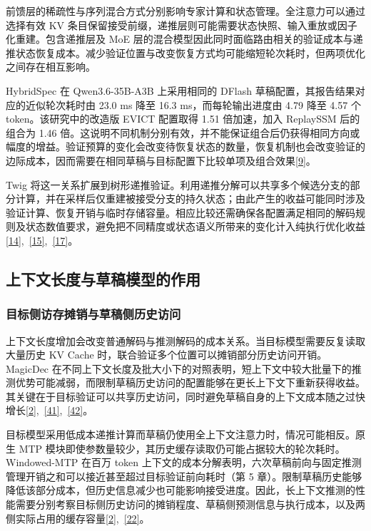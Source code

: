 \documentclass[11pt,a4paper,UTF8,fontset=none,scheme=plain,zihao=-4]{ctexart}
\begin{document}
前馈层的稀疏性与序列混合方式分别影响专家计算和状态管理。全注意力可以通过选择有效
KV
条目保留接受前缀，递推层则可能需要状态快照、输入重放或因子化重建。包含递推层及
MoE
层的混合模型因此同时面临路由相关的验证成本与递推状态恢复成本。减少验证位置与改变恢复方式均可能缩短轮次耗时，但两项优化之间存在相互影响。

HybridSpec 在 Qwen3.6-35B-A3B 上采用相同的 DFlash
草稿配置，其报告结果对应的近似轮次耗时由 23.0 ms 降至 16.3
ms，而每轮输出进度由 4.79 降至 4.57 个 token。该研究中的改造版 EVICT
配置取得 1.51 倍加速，加入 ReplaySSM 后的组合为 1.46
倍。这说明不同机制分别有效，并不能保证组合后仍获得相同方向或幅度的增益。验证预算的变化会改变待恢复状态的数量，恢复机制也会改变验证的边际成本，因而需要在相同草稿与目标配置下比较单项及组合效果\protect\hyperlink{ref-hybridspec}{{[}9{]}}。

Twig
将这一关系扩展到树形递推验证。利用递推分解可以共享多个候选分支的部分计算，并在采样后仅重建被接受分支的持久状态；由此产生的收益可能同时涉及验证计算、恢复开销与临时存储容量。相应比较还需确保各配置满足相同的解码规则及状态数值要求，避免把不同精度或状态语义所带来的变化计入纯执行优化收益\protect\hyperlink{ref-batchspec}{{[}14{]}},~\protect\hyperlink{ref-replayssm}{{[}15{]}},~\protect\hyperlink{ref-twig}{{[}17{]}}。

\hypertarget{section-7-2}{%
\subsection{上下文长度与草稿模型的作用}\label{section-7-2}}

\hypertarget{section-7-2-1}{%
\subsubsection{目标侧访存摊销与草稿侧历史访问}\label{section-7-2-1}}

上下文长度增加会改变普通解码与推测解码的成本关系。当目标模型需要反复读取大量历史
KV Cache 时，联合验证多个位置可以摊销部分历史访问开销。MagicDec
在不同上下文长度及批大小下的对照表明，短上下文中较大批量下的推测优势可能减弱，而限制草稿历史访问的配置能够在更长上下文下重新获得收益。其关键在于目标验证可以共享历史访问，同时避免草稿自身的上下文成本随之过快增长\protect\hyperlink{ref-magicdec}{{[}2{]}},~\protect\hyperlink{ref-triforce}{{[}41{]}},~\protect\hyperlink{ref-longspec}{{[}42{]}}。

目标模型采用低成本递推计算而草稿仍使用全上下文注意力时，情况可能相反。原生
MTP
模块即使参数量较少，其历史缓存读取仍可能占据较大的轮次耗时。Windowed-MTP
在百万 token
上下文的成本分解表明，六次草稿前向与固定推测管理开销之和可以接近甚至超过目标验证前向耗时（第
5
章）。限制草稿历史能够降低该部分成本，但历史信息减少也可能影响接受进度。因此，长上下文推测的性能需要分别考察目标侧历史访问的摊销程度、草稿侧预测信息与执行成本，以及两侧实际占用的缓存容量\protect\hyperlink{ref-magicdec}{{[}2{]}},~\protect\hyperlink{ref-windowedmtp}{{[}22{]}}。
\end{document}
